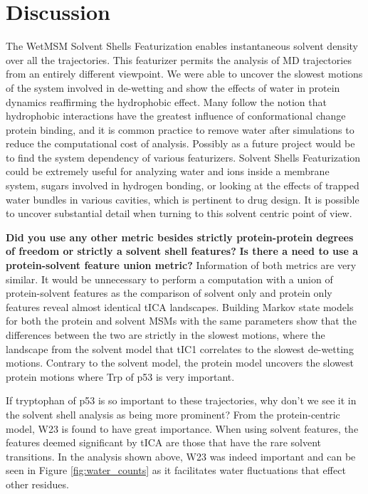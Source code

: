 

\section{Discussion}




The WetMSM Solvent Shells Featurization enables instantaneous solvent density over all the trajectories.  This featurizer permits the analysis of MD trajectories from an entirely different viewpoint. We were able to uncover the slowest motions of the system involved in de-wetting and show the effects of water in protein dynamics reaffirming the hydrophobic effect.  Many follow the notion that hydrophobic interactions have the greatest influence of conformational change protein binding, and it is common practice to remove water after simulations to reduce the computational cost of analysis.
Possibly as a future project would be to find the system dependency of various featurizers.
Solvent Shells Featurization could be extremely useful for analyzing water and ions inside a membrane system, sugars involved in hydrogen bonding, or looking at the effects of trapped water bundles in various cavities, which is pertinent to drug design.  It is possible to  uncover substantial detail when turning to this solvent centric point of view.

\textbf{Did you use any other metric besides strictly protein-protein degrees of freedom or strictly a solvent shell features?} \textbf{Is there a need to use a protein-solvent feature union metric?} Information of both metrics are very similar. It would be unnecessary to perform a computation with a union of protein-solvent features as the comparison of solvent only and protein only features reveal almost identical tICA landscapes. Building Markov state models for both the protein and solvent MSMs with the same parameters show that the differences between the two are strictly in the slowest motions, where the landscape from the solvent model that tIC1 correlates to the slowest de-wetting motions. Contrary to the solvent model, the protein model uncovers the slowest protein motions where Trp of p53 is very important.

If tryptophan of p53 is so important to these trajectories, why don't we see it in the solvent shell analysis as being more prominent?  From the protein-centric model, W23 is found to have great importance.  When using solvent features, the features deemed significant by tICA are those that have the rare solvent transitions.  In the analysis shown above, W23 was indeed important and can be seen in Figure \ref{fig:water_counts} as it facilitates water fluctuations that effect other residues.









